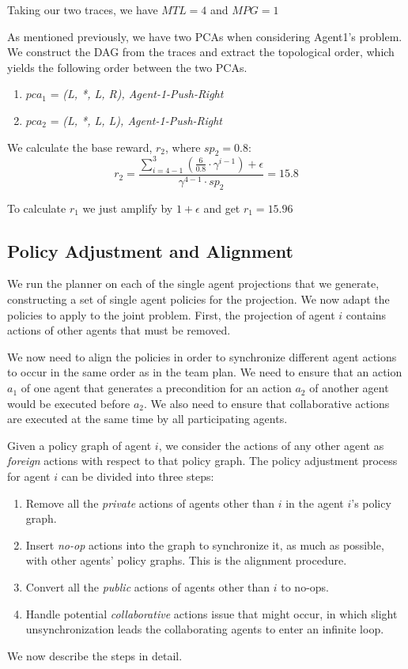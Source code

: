 \documentclass[letterpaper]{article} %
\begin{document}
Taking our two traces, we have $MTL=4$ and $MPG=1$

As mentioned previously, we have two PCAs when considering Agent1's problem.
We construct the DAG from the traces and extract the topological order, which yields the following order between the two PCAs.
\begin{enumerate}
    \item $pca_1$ = \emph{(L, *, L, R), Agent-1-Push-Right}
    \item $pca_2$ = \emph{(L, *, L, L), Agent-1-Push-Right}
\end{enumerate}


We calculate the base reward, $r_2$, where $sp_2=0.8$:
\begin{equation}
     r_2 = \frac{\sum_{i=4 - 1 }^{3}(\frac{6}{0.8} \cdot \gamma^{i-1})+ \epsilon}{\gamma^{4-1}\cdot sp_2} = 15.8 
\end{equation}

To calculate $r_1$ we just amplify by $1+\epsilon$ and get $r_1=15.96$

\subsection{Policy Adjustment and Alignment}

We run the planner on each of the single agent projections that we generate, constructing a set of single agent policies for the projection. We now adapt the policies to apply to the joint problem. First, the projection of agent $i$ contains actions of other agents that must be removed.

We now need to align the policies in order to synchronize different agent actions to occur in the same order as in the team plan. We need to ensure that an action $a_1$ of one agent that generates a precondition for an action $a_2$ of another agent would be executed before $a_2$. We also need to ensure that collaborative actions are executed at the same time by all participating agents. 

Given a policy graph of agent $i$, we consider the actions of any other agent as \emph{foreign} actions with respect to that policy graph. The policy adjustment process for agent $i$ can be divided into three steps:
\begin{enumerate}
    \item Remove all the \emph{private} actions of agents other than $i$ in the agent $i$'s policy graph.
    \item Insert \emph{no-op} actions into the graph to synchronize it, as much as possible, with other agents' policy graphs. This is the alignment procedure.
    \item Convert all the \emph{public} actions of  agents other than $i$ to no-ops.
    \item Handle potential \emph{collaborative} actions issue that might occur, in which slight unsynchronization leads the collaborating agents to enter an infinite loop.
\end{enumerate}
We now describe the steps in detail.
\end{document}
